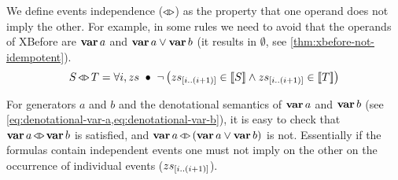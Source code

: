 
We define events independence ($\operatorname{\triangleleft\triangleright}$) as the property that one operand does not imply the other.
For example, in some rules we need to avoid that the operands of \ac{XBefore} are $\operatorname{\mathbf{var}} a$ and $\operatorname{\mathbf{var}} a \lor \operatorname{\mathbf{var}} b$ (it results in $\emptyset$, see \cref{thm:xbefore-not-idempotent}).
%
\begin{equation}
\label{law:independent-events}
S \operatorname{\triangleleft\triangleright} T = \forall i, zs ~\bullet~
  \lnot \left(
    zs_{\left[i..\left(i+1\right)\right]} \in \left[\!\left[S\right]\!\right] \land
    zs_{\left[i..\left(i+1\right)\right]} \in \left[\!\left[T\right]\!\right]
  \right)
\end{equation}

\begin{sloppypar}
For generators $a$ and $b$ and the denotational semantics of $\operatorname{\mathbf{var}} a$ and $\operatorname{\mathbf{var}} b$ (see \cref{eq:denotational-var-a,eq:denotational-var-b}), it is easy to check that $\operatorname{\mathbf{var}} a \operatorname{\triangleleft\triangleright} \operatorname{\mathbf{var}} b$ is satisfied, and $\operatorname{\mathbf{var}} a \operatorname{\triangleleft\triangleright} \left(\operatorname{\mathbf{var}} a \lor \operatorname{\mathbf{var}} b\right)$ is not.
Essentially if the formulas contain independent events one must not imply on the other on the occurrence of individual events ($zs_{\left[i..\left(i+1\right)\right]}$).
\end{sloppypar}


